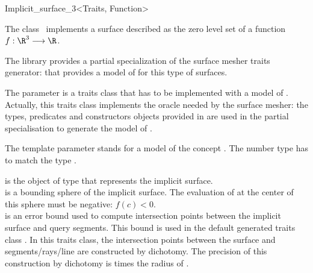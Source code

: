 

\begin{ccRefClass}{Implicit_surface_3<Traits, Function>}


\ccDefinition
  
The class \ccRefName\  implements a surface described 
as the zero level
set  of a function \begin{math}f : \R^3 \longrightarrow \R\end{math}.


The library provides a partial specialization
of the  surface mesher traits generator:
that provides a model of  for this type of surfaces.


The parameter  is a traits class 
that has to be implemented with a model of 
.
Actually, this traits class implements the oracle needed by the
surface mesher:
the types, predicates and constructors objects provided
in  are
used in 
the partial specialisation 
to generate the model of  .

The template parameter   stands for a model
of the concept .
The number type  has to match
the type .


\ccCreation
{}

{ is the object of type  that represents the implicit
  surface.\\
  is a bounding sphere of the implicit surface. The
 evaluation of  at the center  of this sphere must be
 negative: $f(c)<0$.\\
  is an error bound 
used to  compute intersection points between the implicit surface
and  query segments. This bound is used in  the default generated traits class
 . In this traits class, the intersection points between
the surface and segments/rays/line are constructed by dichotomy. The
precision of this construction by dichotomy is  times the
radius of .}


\end{ccRefClass}
